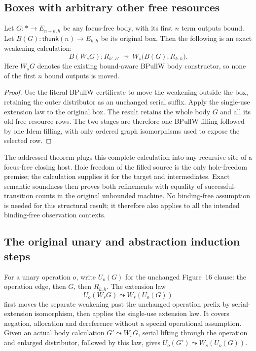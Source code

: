 \subsection{Boxes with arbitrary other free resources}
\begin{theorem}
Let $G:*\to E_{n+k,h}$ be any focus-free body, with its first $n$ term
outputs bound. Let $B(G):\mathsf{thunk}(n)\to E_{k,h}$ be its original box.
Then the following is an exact weakening calculation:
\[
 B(W_sG);R_{k',h'}\ \leadsto\ W_s\bigl(B(G);R_{k,h}\bigr).
\]
Here $W_sG$ denotes the existing bound-aware BPullW body constructor, so
none of the first $n$ bound outputs is moved.
\end{theorem}
\begin{proof}
Use the literal BPullW certificate to move the weakening outside the box,
retaining the outer distributor as an unchanged serial suffix. Apply the
single-use extension law to the original box. The result retains the whole
body $G$ and all its old free-resource rows. The two stages are therefore
one BPullW filling followed by one Idem filling, with only ordered graph
isomorphisms used to expose the selected row.
\end{proof}

The addressed theorem plugs this complete calculation into any recursive
site of a focus-free closing host. Hole freedom of the filled source is the
only hole-freedom premise; the calculation supplies it for the target and
intermediates. Exact semantic soundness then proves both refinements with
equality of successful-transition counts in the original unbounded machine.
No binding-free assumption is needed for this structural result; it therefore
also applies to all the intended binding-free observation contexts.

\subsection{The original unary and abstraction induction steps}
For a unary operation $o$, write $U_o(G)$ for the unchanged Figure~16
clause: the operation edge, then $G$, then $R_{k,h}$. The extension law
\[
 U_o(W_sG)\leadsto W_s(U_o(G))
\]
first moves the separate weakening past the unchanged operation prefix by
serial-extension isomorphism, then applies the single-use extension law.
It covers negation, allocation and dereference without a special operational
assumption. Given an actual body calculation $G'\leadsto W_sG$, serial
lifting through the operation and enlarged distributor, followed by this
law, gives $U_o(G')\leadsto W_s(U_o(G))$.

